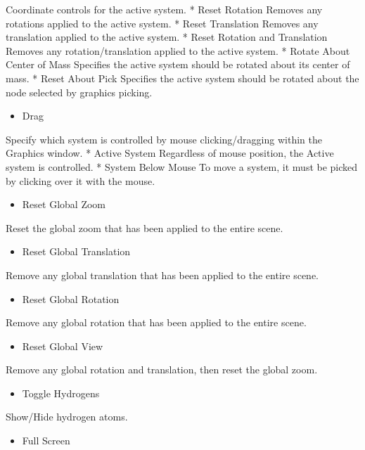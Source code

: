 \documentclass[letterpaper,11pt,english]{sphinxmanual}
\begin{document}
Coordinate controls for the active system.
* Reset Rotation
Removes any rotations applied to the active system.
* Reset Translation
Removes any translation applied to the active system.
* Reset Rotation and Translation
Removes any rotation/translation applied to the active system.
* Rotate About Center of Mass
Specifies the active system should be rotated about its center of mass.
* Reset About Pick
Specifies the active system should be rotated about the node selected by graphics picking.
\begin{itemize}
\item {} 
Drag

\end{itemize}

Specify which system is controlled by mouse clicking/dragging within the Graphics window.
* Active System
Regardless of mouse position, the Active system is controlled.
* System Below Mouse
To move a system, it must be picked by clicking over it with the mouse.
\begin{itemize}
\item {} 
Reset Global Zoom

\end{itemize}

Reset the global zoom that has been applied to the entire scene.
\begin{itemize}
\item {} 
Reset Global Translation

\end{itemize}

Remove any global translation that has been applied to the entire scene.
\begin{itemize}
\item {} 
Reset Global Rotation

\end{itemize}

Remove any global rotation that has been applied to the entire scene.
\begin{itemize}
\item {} 
Reset Global View

\end{itemize}

Remove any global rotation and translation, then reset the global zoom.
\begin{itemize}
\item {} 
Toggle Hydrogens

\end{itemize}

Show/Hide hydrogen atoms.
\begin{itemize}
\item {} 
Full Screen

\end{itemize}
\end{document}
